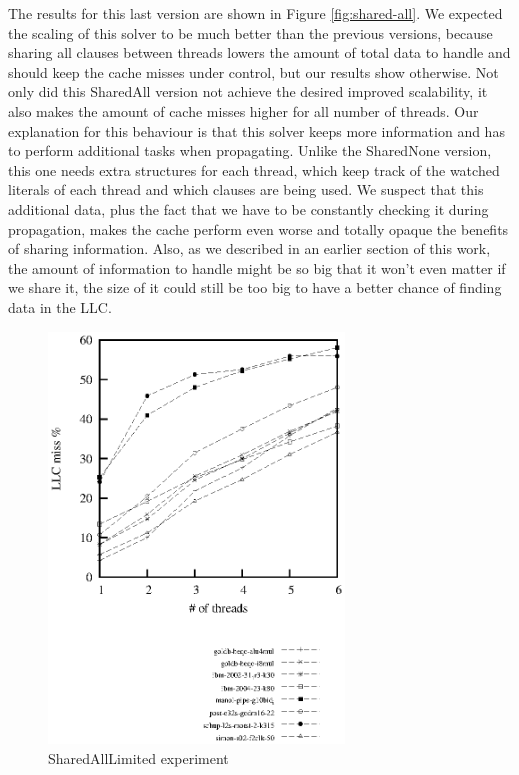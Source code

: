 \documentclass[12pt]{diicc}
\begin{document}
The results for this last version are shown in Figure \ref{fig:shared-all}. We expected the scaling of this solver to be much better than the previous versions, because sharing all clauses between threads lowers the amount of total data to handle and should keep the cache misses under control, but our results show otherwise. Not only did this SharedAll version not achieve the desired improved scalability, it also makes the amount of cache misses higher for all number of threads. Our explanation for this behaviour is that this solver keeps more information and has to perform additional tasks when propagating. Unlike the SharedNone version, this one needs extra structures for each thread, which keep track of the watched literals of each thread and which clauses are being used. We suspect that this additional data, plus the fact that we have to be constantly checking it during propagation, makes the cache perform even worse and totally opaque the benefits of sharing information. Also, as we described in an earlier section of this work, the amount of information to handle might be so big that it won't even matter if we share it, the size of it could still be too big to have a better chance of finding data in the LLC.

\begin{figure}[h!]
	\centering
		\includegraphics[width=0.7\textwidth]{shared-all-start}
	\caption{SharedAllLimited experiment}
	\label{fig:shared-all-start}
\end{figure}
\end{document}
